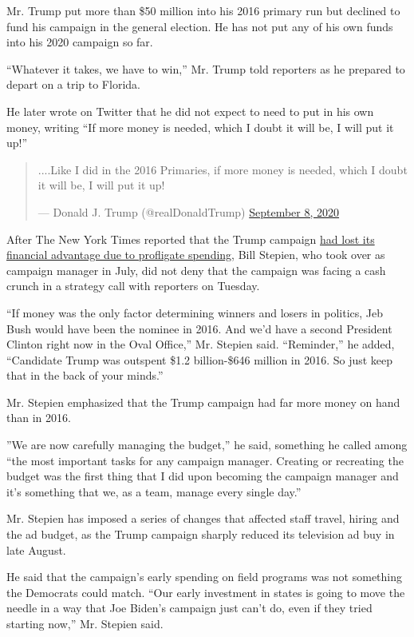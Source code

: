 Mr. Trump put more than \$50 million into his 2016 primary run but
declined to fund his campaign in the general election. He has not put
any of his own funds into his 2020 campaign so far.

``Whatever it takes, we have to win,'' Mr. Trump told reporters as he
prepared to depart on a trip to Florida.

He later wrote on Twitter that he did not expect to need to put in his
own money, writing ``If more money is needed, which I doubt it will be,
I will put it up!''

\begin{quote}
....Like I did in the 2016 Primaries, if more money is needed, which I
doubt it will be, I will put it up!

--- Donald J. Trump (@realDonaldTrump)
\href{https://twitter.com/realDonaldTrump/status/1303368660736598016?ref_src=twsrc\%5Etfw}{September
8, 2020}
\end{quote}

After The New York Times reported that the Trump campaign
\href{https://www.nytimes3xbfgragh.onion/2020/09/07/us/politics/trump-election-campaign-fundraising.html?action=click\&module=RelatedLinks\&pgtype=Article}{had
lost its financial advantage due to profligate spending}, Bill Stepien,
who took over as campaign manager in July, did not deny that the
campaign was facing a cash crunch in a strategy call with reporters on
Tuesday.

``If money was the only factor determining winners and losers in
politics, Jeb Bush would have been the nominee in 2016. And we'd have a
second President Clinton right now in the Oval Office,'' Mr. Stepien
said. ``Reminder,'' he added, ``Candidate Trump was outspent \$1.2
billion-\$646 million in 2016. So just keep that in the back of your
minds.''

Mr. Stepien emphasized that the Trump campaign had far more money on
hand than in 2016.

''We are now carefully managing the budget,'' he said, something he
called among ``the most important tasks for any campaign manager.
Creating or recreating the budget was the first thing that I did upon
becoming the campaign manager and it's something that we, as a team,
manage every single day.''

Mr. Stepien has imposed a series of changes that affected staff travel,
hiring and the ad budget, as the Trump campaign sharply reduced its
television ad buy in late August.

He said that the campaign's early spending on field programs was not
something the Democrats could match. ``Our early investment in states is
going to move the needle in a way that Joe Biden's campaign just can't
do, even if they tried starting now,'' Mr. Stepien said.


